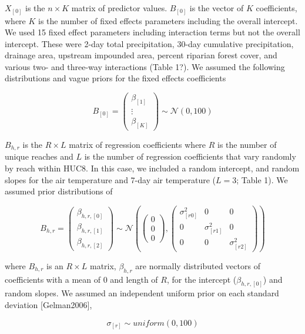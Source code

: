 \(X_{[0]}\) is the \(n \times K\) matrix of predictor values.
\(B_{[0]}\) is the vector of \(K\) coefficients, where \(K\) is the
number of fixed effects parameters including the overall intercept. We
used 15 fixed effect parameters including interaction terms but not the
overall intercept. These were 2-day total precipitation, 30-day
cumulative precipitation, drainage area, upstream impounded area,
percent riparian forest cover, and various two- and three-way
interactions (Table 1?). We assumed the following distributions and
vague priors for the fixed effects coefficients

\[ 
B_{[0]} = \left( \begin{array}{c} \beta_{[1]} \\ \vdots \\ \beta_{[K]} \end{array} \right) \sim \mathcal{N}(0, 100) 
\]

\(B_{h,r}\) is the \(R \times L\) matrix of regression coefficients
where \(R\) is the number of unique reaches and \(L\) is the number of
regression coefficients that vary randomly by reach within HUC8. In this
case, we included a random intercept, and random slopes for the air
temperature and 7-day air temperature (\(L = 3\); Table 1). We assumed
prior distributions of

\[ 
B_{h,r} = \left( \begin{array}{c} \beta_{h,r,[0]} \\ \beta_{h,r,[1]} \\ \beta_{h,r,[2]} \end{array} \right) \sim \mathcal{N}\left(\left(\begin{array}{c} 0 \\ 0 \\ 0 \end{array} \right), \left( \begin{array}{ccc} \sigma_{[r0]}^2 & 0 & 0 \\ 0 & \sigma_{[r1]}^2 & 0 \\ 0 & 0 & \sigma_{[r2]}^2 \end{array} \right) \right)
\]

where \(B_{h,r}\) is an \(R \times L\) matrix, \(\beta_{h,r}\) are
normally distributed vectors of coefficients with a mean of 0 and length
of \(R\), for the intercept (\(\beta_{h,r,[0]}\)) and random slopes. We
assumed an independent uniform prior on each standard deviation
{[}Gelman2006{]},

\[ 
\sigma_{[r]} \sim uniform(0,100)
\]

